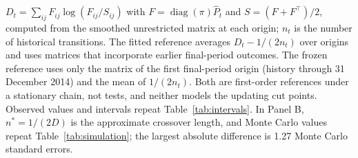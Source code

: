 \begin{table}[!htbp]\centering\footnotesize\setlength{\tabcolsep}{3pt}
\caption{Closed-form reference for the cost of detailed balance}\label{tab:restriction}

\medskip
{}
\par\smallskip\parbox{0.98\linewidth}{\footnotesize $D_t=\sum_{ij}F_{ij}\log(F_{ij}/S_{ij})$ with $F=\operatorname{diag}(\pi)\hat P_t$ and $S=(F+F^\top)/2$, computed from the smoothed unrestricted matrix at each origin; $n_t$ is the number of historical transitions. The fitted reference averages $D_t-1/(2n_t)$ over origins and uses matrices that incorporate earlier final-period outcomes. The frozen reference uses only the matrix of the first final-period origin (history through 31 December 2014) and the mean of $1/(2n_t)$. Both are first-order references under a stationary chain, not tests, and neither models the updating cut points. Observed values and intervals repeat Table~\ref{tab:intervals}. In Panel B, $n^\ast=1/(2D)$ is the approximate crossover length, and Monte Carlo values repeat Table~\ref{tab:simulation}; the largest absolute difference is 1.27 Monte Carlo standard errors.}
\end{table}
